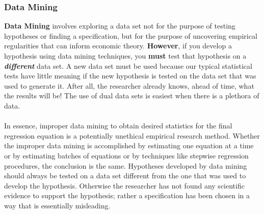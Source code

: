 \documentclass[11pt]{article}
\begin{document}
\subsubsection{Data Mining}
\textbf{Data Mining} involves exploring a data set not for the purpose of testing hypotheses or finding a specification, but for the purpose of uncovering empirical regularities that can inform economic theory. 
\textbf{However}, if you develop a hypothesis using data mining techniques, you \textbf{must} test that hypothesis on a \textit{\textbf{different}} data set. A new data set must be used because our typical statistical tests have little meaning if the new hypothesis is tested on the data set that was used to generate it. After all, the researcher already knows, ahead of time, what the results will be! The use of dual data sets is easiest when there is a plethora of data. \\ \\
In essence, improper data mining to obtain desired statistics for the final regression equation is a potentially unethical empirical research method. Whether the improper data mining is accomplished by estimating one equation at a time or by estimating batches of equations or by techniques like stepwise regression procedures, the conclusion is the same. Hypotheses developed by data mining should always be tested on a data set different from the one that was used to develop the hypothesis. Otherwise the researcher has not found any scientific evidence to support the hypothesis; rather a specification has been chosen in a way that is essentially misleading.
\end{document}

